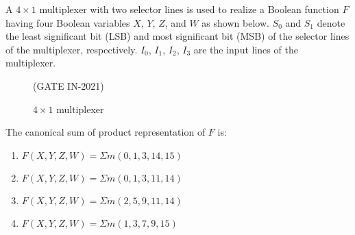  A $4 \times 1$ multiplexer with two selector lines is used to realize a Boolean function $F$ having four Boolean variables $X$, $Y$, $Z$, and $W$ as shown below. $S_0$ and $S_1$ denote the least significant bit (LSB) and most significant bit (MSB) of the selector lines of the multiplexer, respectively. $I_0$, $I_1$, $I_2$, $I_3$ are the input lines of the multiplexer.
\begin{figure}[H]
\begin{center}

\caption{$4\times 1$ multiplexer}
\end{center}
\label{fig:4MUX}
\hfill (GATE IN-2021)
\end{figure}

The canonical sum of product representation of $F$ is:

\begin{enumerate}[label=(\Alph*)]
  \item $F(X, Y, Z, W) = \Sigma m(0,1,3,14,15)$
  \item $F(X, Y, Z, W) = \Sigma m(0,1,3,11,14)$
  \item $F(X, Y, Z, W) = \Sigma m(2,5,9,11,14)$
  \item $F(X, Y, Z, W) = \Sigma m(1,3,7,9,15)$
\end{enumerate}
